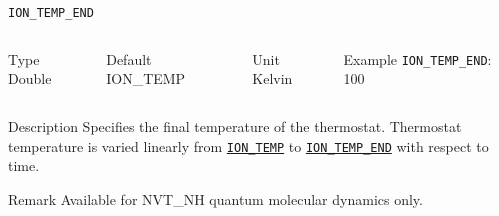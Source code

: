 \begin{frame}[allowframebreaks]{\texttt{ION\_TEMP\_END}} \label{ION_TEMP_END}
\vspace*{-12pt}
\begin{columns}
\begin{block}{Type}
Double
\end{block}

\begin{block}{Default}
ION\_TEMP
\end{block}

\begin{block}{Unit}
Kelvin
\end{block}

\begin{block}{Example}
\texttt{ION\_TEMP\_END}: 100
\end{block}
\end{columns}

\begin{block}{Description}
Specifies the final temperature of the thermostat. Thermostat temperature is varied linearly from \hyperlink{ION_TEMP}{\texttt{ION\_TEMP}} to \hyperlink{ION_TEMP_END}{\texttt{ION\_TEMP\_END}} with respect to time.
\end{block}

\begin{block}{Remark}
Available for NVT\_NH quantum molecular dynamics only.
\end{block}

\end{frame}




